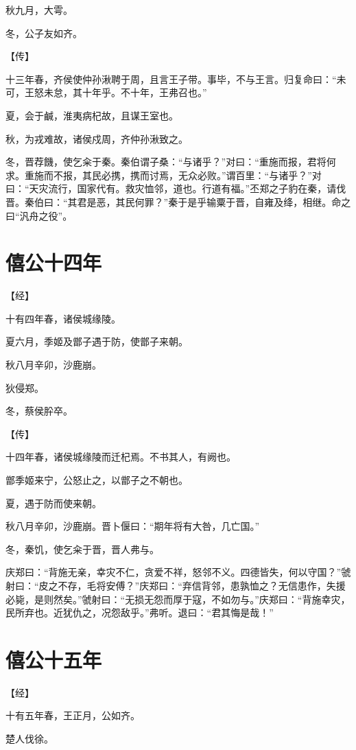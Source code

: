 \documentclass[a4paper,12pt,UTF8,twoside]{ctexbook}
\begin{document}
秋九月，大雩。

冬，公子友如齐。

【传】

十三年春，齐侯使仲孙湫聘于周，且言王子带。事毕，不与王言。归复命曰：“未可，王怒未怠，其十年乎。不十年，王弗召也。”

夏，会于鹹，淮夷病杞故，且谋王室也。

秋，为戎难故，诸侯戍周，齐仲孙湫致之。

冬，晋荐饑，使乞籴于秦。秦伯谓子桑：“与诸乎？”对曰：“重施而报，君将何求。重施而不报，其民必携，携而讨焉，无众必败。”谓百里：“与诸乎？”对曰：“天灾流行，国家代有。救灾恤邻，道也。行道有福。”丕郑之子豹在秦，请伐晋。秦伯曰：“其君是恶，其民何罪？”秦于是乎输粟于晋，自雍及绛，相继。命之曰“汎舟之役”。

\section{僖公十四年}



【经】

十有四年春，诸侯城缘陵。

夏六月，季姬及鄫子遇于防，使鄫子来朝。

秋八月辛卯，沙鹿崩。

狄侵郑。

冬，蔡侯肸卒。

【传】

十四年春，诸侯城缘陵而迁杞焉。不书其人，有阙也。

鄫季姬来宁，公怒止之，以鄫子之不朝也。

夏，遇于防而使来朝。

秋八月辛卯，沙鹿崩。晋卜偃曰：“期年将有大咎，几亡国。”

冬，秦饥，使乞籴于晋，晋人弗与。

庆郑曰：“背施无亲，幸灾不仁，贪爱不祥，怒邻不义。四德皆失，何以守国？”虢射曰：“皮之不存，毛将安傅？”庆郑曰：“弃信背邻，患孰恤之？无信患作，失援必毙，是则然矣。”虢射曰：“无损无怨而厚于寇，不如勿与。”庆郑曰：“背施幸灾，民所弃也。近犹仇之，况怨敌乎。”弗听。退曰：“君其悔是哉！”

\section{僖公十五年}



【经】

十有五年春，王正月，公如齐。

楚人伐徐。
\end{document}
